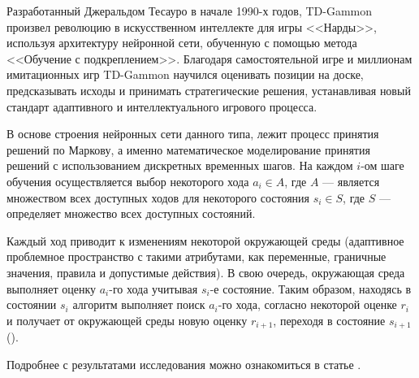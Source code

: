 Разработанный Джеральдом Тесауро в начале 1990-х годов, TD-Gammon произвел революцию в искусственном интеллекте для игры <<Нарды>>, используя архитектуру нейронной сети, обученную с помощью метода <<Обучение с подкреплением>>. Благодаря самостоятельной игре и миллионам имитационных игр TD-Gammon научился оценивать позиции на доске, предсказывать исходы и принимать стратегические решения, устанавливая новый стандарт адаптивного и интеллектуального игрового процесса.

В основе строения нейронных сети данного типа, лежит процесс принятия решений по Маркову, а именно математическое моделирование принятия решений с использованием дискретных временных шагов. На каждом $i$-ом шаге обучения осуществляется выбор некоторого хода $a_i \in A$, где $A$ --- является множеством всех доступных ходов для некоторого состояния $s_i \in S$, где $S$ --- определяет множество всех доступных состояний.

Каждый ход приводит к изменениям некоторой окружающей среды (адаптивное проблемное пространство с такими атрибутами, как переменные, граничные значения, правила и допустимые действия). В свою очередь, окружающая среда выполняет оценку $a_i$-го хода учитывая $s_i$-е состояние. Таким образом, находясь в состоянии $s_i$ алгоритм выполняет поиск $a_i$-го хода, согласно некоторой оценке $r_i$ и получает от окружающей среды новую оценку $r_{i + 1}$, переходя в состояние $s_{i + 1}$ ().


Подробнее с результатами исследования можно ознакомиться в статье \cite{tdl-gammon}.
